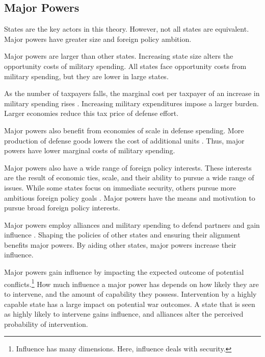\documentclass[12pt]{article}
\begin{document}
\subsection{Major Powers}

States are the key actors in this theory. 
However, not all states are equivalent.
Major powers have greater size and foreign policy ambition. 


Major powers are larger than other states. 
Increasing state size alters the opportunity costs of military spending.  
All states face opportunity costs from military spending, but they are lower in large states.  


As the number of taxpayers falls, the marginal cost per taxpayer of an increase in military spending rises \citep{DudleyMontmarquette1981}. 
Increasing military expenditures impose a larger burden.
Larger economies reduce this tax price of defense effort. 


Major powers also benefit from economies of scale in defense spending. 
More production of defense goods lowers the cost of additional units \citep{Moravcsik1991, AlesinaSpolaore2006}. 
Thus, major powers have lower marginal costs of military spending.  


Major powers also have a wide range of foreign policy interests.
These interests are the result of economic ties, scale, and their ability to pursue a wide range of issues. 
While some states focus on immediate security, others pursue more ambitious foreign policy goals \citep{Fordham2011, MarkowitzFariss2017}. 
Major powers have the means and motivation to pursue broad foreign policy interests.  


Major powers employ alliances and military spending to defend partners and gain influence \citep{Morrow1991}. 
Shaping the policies of other states and ensuring their alignment benefits major powers. 
By aiding other states, major powers increase their influence. 


Major powers gain influence by impacting the expected outcome of potential conflicts.\footnote{Influence has many dimensions. Here, influence deals with security.} 
How much influence a major power has depends on how likely they are to intervene, and the amount of capability they possess. 
Intervention by a highly capable state has a large impact on potential war outcomes. 
A state that is seen as highly likely to intervene gains influence, and alliances alter the perceived probability of intervention. 
\end{document}
